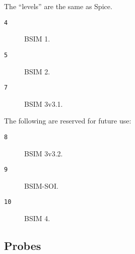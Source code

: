 The ``levels'' are the same as Spice.

\begin{description}
\item[{\tt 4}] BSIM 1.
\item[{\tt 5}] BSIM 2.
\item[{\tt 7}] BSIM 3v3.1.
\end{description}

The following are reserved for future use:
\begin{description}
\item[{\tt 8}] BSIM 3v3.2.
\item[{\tt 9}] BSIM-SOI.
\item[{\tt 10}] BSIM 4.
\end{description}
\subsection{Probes}
 
